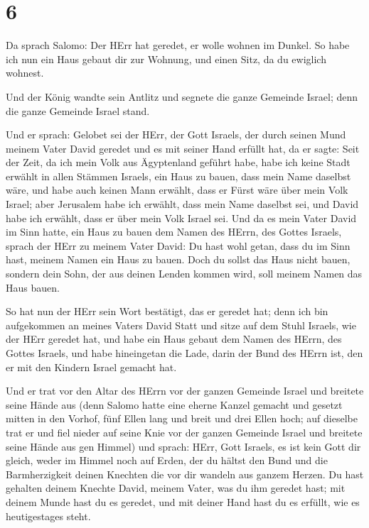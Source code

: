 \hypertarget{section-1}{%
\section{6}\label{section-1}}

 Da sprach Salomo: Der HErr hat geredet, er wolle wohnen im
Dunkel.  So habe ich nun ein Haus gebaut dir zur Wohnung,
und einen Sitz, da du ewiglich wohnest.

 Und der König wandte sein Antlitz und segnete die ganze
Gemeinde Israel; denn die ganze Gemeinde Israel stand.

 Und er sprach: Gelobet sei der HErr, der Gott Israels, der
durch seinen Mund meinem Vater David geredet und es mit seiner Hand
erfüllt hat, da er sagte:  Seit der Zeit, da ich mein Volk
aus Ägyptenland geführt habe, habe ich keine Stadt erwählt in allen
Stämmen Israels, ein Haus zu bauen, dass mein Name daselbst wäre, und
habe auch keinen Mann erwählt, dass er Fürst wäre über mein Volk Israel;
 aber Jerusalem habe ich erwählt, dass mein Name daselbst
sei, und David habe ich erwählt, dass er über mein Volk Israel sei.
 Und da es mein Vater David im Sinn hatte, ein Haus zu bauen
dem Namen des HErrn, des Gottes Israels,  sprach der HErr zu
meinem Vater David: Du hast wohl getan, dass du im Sinn hast, meinem
Namen ein Haus zu bauen.  Doch du sollst das Haus nicht
bauen, sondern dein Sohn, der aus deinen Lenden kommen wird, soll meinem
Namen das Haus bauen.

 So hat nun der HErr sein Wort bestätigt, das er geredet
hat; denn ich bin aufgekommen an meines Vaters David Statt und sitze auf
dem Stuhl Israels, wie der HErr geredet hat, und habe ein Haus gebaut
dem Namen des HErrn, des Gottes Israels,  und habe
hineingetan die Lade, darin der Bund des HErrn ist, den er mit den
Kindern Israel gemacht hat.

 Und er trat vor den Altar des HErrn vor der ganzen
Gemeinde Israel und breitete seine Hände aus  (denn Salomo
hatte eine eherne Kanzel gemacht und gesetzt mitten in den Vorhof, fünf
Ellen lang und breit und drei Ellen hoch; auf dieselbe trat er und fiel
nieder auf seine Knie vor der ganzen Gemeinde Israel und breitete seine
Hände aus gen Himmel)  und sprach: HErr, Gott Israels, es
ist kein Gott dir gleich, weder im Himmel noch auf Erden, der du hältst
den Bund und die Barmherzigkeit deinen Knechten die vor dir wandeln aus
ganzem Herzen.  Du hast gehalten deinem Knechte David,
meinem Vater, was du ihm geredet hast; mit deinem Munde hast du es
geredet, und mit deiner Hand hast du es erfüllt, wie es heutigestages
steht.

